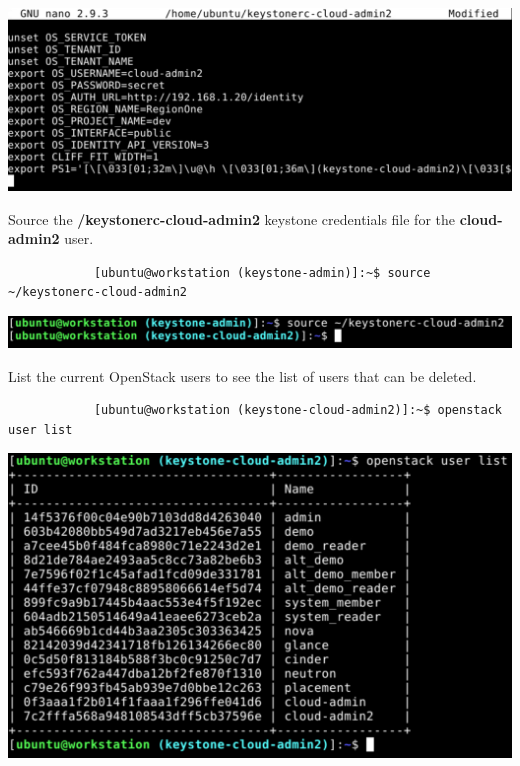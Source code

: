 \documentclass[letterpaper, 12pt]{article}
\begin{document}
\begin{enumerate}
\begin{labstep}
        \begin{center}
            \includegraphics[width=\linewidth]{images/appendix/step5.png}
        \end{center}
    \end{labstep}

    \begin{labstep}
        Source the \textbf{\texttildemid/keystonerc-cloud-admin2} keystone credentials file for the \textbf{cloud-admin2} user.
        \begin{lstlisting}
            [ubuntu@workstation (keystone-admin)]:~$ source ~/keystonerc-cloud-admin2
        \end{lstlisting}

        \begin{center}
            \includegraphics[width=\linewidth]{images/appendix/step6.png}
        \end{center}
    \end{labstep}

    \begin{labstep}
        List the current OpenStack users to see the list of users that can be deleted.
        \begin{lstlisting}
            [ubuntu@workstation (keystone-cloud-admin2)]:~$ openstack user list
        \end{lstlisting}

        \begin{center}
            \includegraphics[width=\linewidth]{images/appendix/step7.png}
        \end{center}
    \end{labstep}


\end{enumerate}
\end{document}
